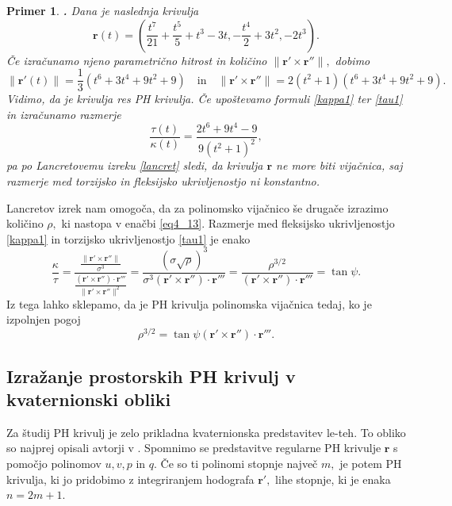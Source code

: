 \documentclass[12pt,a4paper,twoside]{article}
\theoremstyle{definition} %
\theoremstyle{plain} %
\theoremstyle{primerstyle}
\newtheorem{primer}[definicija]{Primer}
\numberwithin{equation}{section}  %
\newcommand{\fleksija}{\frac{\lVert \mathbf{r}'\times\mathbf{r}'' \rVert}{\sigma^3}}
\newcommand{\torzija}{\frac{(\mathbf{r}'\times\mathbf{r}'')\cdot\mathbf{r}'''}{\lVert \mathbf{r}'\times\mathbf{r}'' \rVert^2}}
\newcommand{\rV}{\mathbf{r}}
\begin{document}
\begin{primer}
	\label{PH_ne_vijacnica}
	\textbf{.} Dana je naslednja krivulja
	\begin{equation*}
		\rV(t)=\left ( \frac{t^7}{21}+\frac{t^5}{5}+t^3-3t,-\frac{t^4}{2}+3t^2,-2t^3 \right ).
	\end{equation*}
	Če izračunamo njeno parametrično hitrost in količino $\lVert \rV' \times \rV'' \rVert,$ dobimo
	\begin{equation*}
		\lVert \rV'(t) \rVert=\frac{1}{3}(t^6+3t^4+9t^2+9) \quad \text{in} \quad \lVert \rV' \times \rV'' \rVert=2(t^2+1)(t^6+3t^4+9t^2+9).
	\end{equation*}
	Vidimo, da je krivulja res PH krivulja. Če upoštevamo formuli \eqref{kappa1} ter \eqref{tau1} in izračunamo razmerje
	\begin{equation*}
		\frac{\tau(t)}{\kappa(t)}=\frac{2t^6+9t^4-9}{9(t^2+1)^2},
	\end{equation*}
	pa po Lancretovemu izreku \ref{lancret} sledi, da krivulja $\rV$ ne more biti vijačnica, saj razmerje med torzijsko in fleksijsko ukrivljenostjo ni konstantno.
\end{primer}

Lancretov izrek nam omogoča, da za polinomsko vijačnico še drugače izrazimo količino $\rho,$ ki nastopa v enačbi \eqref{eq4_13}. Razmerje med fleksijsko ukrivljenostjo \eqref{kappa1} in torzijsko ukrivljenostjo \eqref{tau1} je enako
\begin{equation}
	\label{rho3over2}
	\frac{\kappa}{\tau}=\frac{\fleksija}{\torzija}=\frac{(\sigma \sqrt{\rho})^3}{\sigma^3(\rV'\times\rV'')\cdot\rV'''}=\frac{\rho^{3/2}}{(\rV'\times\rV'')\cdot\rV'''}=\tan \psi.
\end{equation}
Iz tega lahko sklepamo, da je PH krivulja polinomska vijačnica tedaj, ko je izpolnjen pogoj
\begin{equation}
	\label{rho_helix_pogoj}
	\rho^{3/2}=\tan \psi (\rV'\times\rV'')\cdot\rV'''.
\end{equation}

\subsection{Izražanje prostorskih PH krivulj v kvaternionski obliki}
\label{PH_kvaternioni}

Za študij PH krivulj je zelo prikladna kvaternionska predstavitev le-teh. To obliko so najprej opisali avtorji v \cite{choi2002clifford}. Spomnimo se predstavitve regularne PH krivulje $\rV$ s pomočjo polinomov $u,v,p$ in $q.$ Če so ti polinomi stopnje največ $m,$ je potem PH krivulja, ki jo pridobimo z integriranjem hodografa $\rV',$ lihe stopnje, ki je enaka $n=2m+1.$
\end{document}
